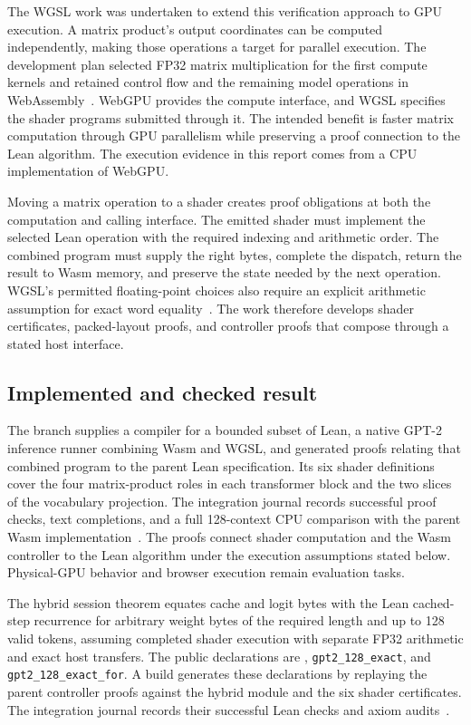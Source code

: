\documentclass[11pt]{article}
\newcommand{\code}[1]{\texttt{#1}}
\newcommand{\longcode}[1]{\texttt{\seqsplit{#1}}}
\begin{document}
The WGSL work was undertaken to extend this verification approach to GPU execution.  A matrix product's output coordinates can be computed independently, making those operations a target for parallel execution.  The development plan selected FP32 matrix multiplication for the first compute kernels and retained control flow and the remaining model operations in WebAssembly~\cite{plan}.  WebGPU provides the compute interface, and WGSL specifies the shader programs submitted through it.  The intended benefit is faster matrix computation through GPU parallelism while preserving a proof connection to the Lean algorithm.  The execution evidence in this report comes from a CPU implementation of WebGPU.

Moving a matrix operation to a shader creates proof obligations at both the computation and calling interface.  The emitted shader must implement the selected Lean operation with the required indexing and arithmetic order.  The combined program must supply the right bytes, complete the dispatch, return the result to Wasm memory, and preserve the state needed by the next operation.  WGSL's permitted floating-point choices also require an explicit arithmetic assumption for exact word equality~\cite{wgsl}.  The work therefore develops shader certificates, packed-layout proofs, and controller proofs that compose through a stated host interface.

\subsection{Implemented and checked result}

The branch supplies a compiler for a bounded subset of Lean, a native GPT-2 inference runner combining Wasm and WGSL, and generated proofs relating that combined program to the parent Lean specification.  Its six shader definitions cover the four matrix-product roles in each transformer block and the two slices of the vocabulary projection.  The integration journal records successful proof checks, text completions, and a full 128-context CPU comparison with the parent Wasm implementation~\cite{packedguide,journal}.  The proofs connect shader computation and the Wasm controller to the Lean algorithm under the execution assumptions stated below.  Physical-GPU behavior and browser execution remain evaluation tasks.

The hybrid session theorem equates cache and logit bytes with the Lean cached-step recurrence for arbitrary weight bytes of the required length and up to 128 valid tokens, assuming completed shader execution with separate FP32 arithmetic and exact host transfers.  The public declarations are \longcode{Project.Gpt2Hybrid.Spec.cachedStep\_exact}, \code{gpt2\_128\_exact}, and \code{gpt2\_128\_exact\_for}.  A build generates these declarations by replaying the parent controller proofs against the hybrid module and the six shader certificates.  The integration journal records their successful Lean checks and axiom audits~\cite{composition,journal}.
\end{document}
